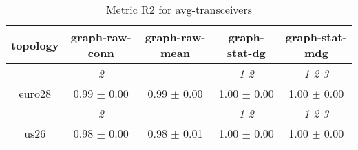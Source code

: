\begin{table}[h]
\caption{Metric R2 for avg-transceivers}

        \centering
        \begin{tabular}{
        ccccc} \toprule 
 topology& graph-raw-conn & graph-raw-mean & graph-stat-dg & graph-stat-mdg \\ \toprule
 & \cellcolor[HTML]{EFEFEF} \textit{ 2 }& \cellcolor[HTML]{EFEFEF} & \cellcolor[HTML]{EFEFEF} \textit{ 1 2 }& \cellcolor[HTML]{EFEFEF} \textit{ 1 2 3 } \\ 
 {euro28}& \cellcolor[HTML]{EFEFEF} 0.99 $\pm$ 0.00& \cellcolor[HTML]{EFEFEF} 0.99 $\pm$ 0.00& \cellcolor[HTML]{EFEFEF} 1.00 $\pm$ 0.00& \cellcolor[HTML]{EFEFEF} 1.00 $\pm$ 0.00 \\ 
& \cellcolor[HTML]{EFEFEF} \textit{ 2 }& \cellcolor[HTML]{EFEFEF} & \cellcolor[HTML]{EFEFEF} \textit{ 1 2 }& \cellcolor[HTML]{EFEFEF} \textit{ 1 2 3 } \\ 
 {us26}& \cellcolor[HTML]{EFEFEF} 0.98 $\pm$ 0.00& \cellcolor[HTML]{EFEFEF} 0.98 $\pm$ 0.01& \cellcolor[HTML]{EFEFEF} 1.00 $\pm$ 0.00& \cellcolor[HTML]{EFEFEF} 1.00 $\pm$ 0.00 \\ 

        \bottomrule
        \end{tabular}%

        \end{table}
        

